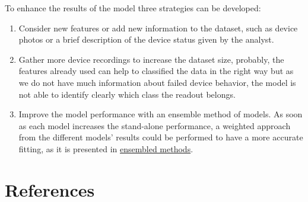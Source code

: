 \documentclass[11pt]{article}
\begin{document}
To enhance the results of the model three strategies can be developed:

\begin{enumerate}
\def\labelenumi{\arabic{enumi}.}
\item
  Consider new features or add new information to the dataset, such as
  device photos or a brief description of the device status given by the
  analyst.
\item
  Gather more device recordings to increase the dataset size, probably,
  the features already used can help to classified the data in the right
  way but as we do not have much information about failed device
  behavior, the model is not able to identify clearly which class the
  readout belongs.
\item
  Improve the model performance with an ensemble method of models. As
  soon as each model increases the stand-alone performance, a weighted
  approach from the different models' results could be performed to have
  a more accurate fitting, as it is presented in
  \href{https://towardsdatascience.com/ensemble-methods-bagging-boosting-and-stacking-c9214a10a205}{ensembled
  methods}.
\end{enumerate}

    \hypertarget{references}{%
\section{References}\label{references}}


    
    



    
\end{document}
